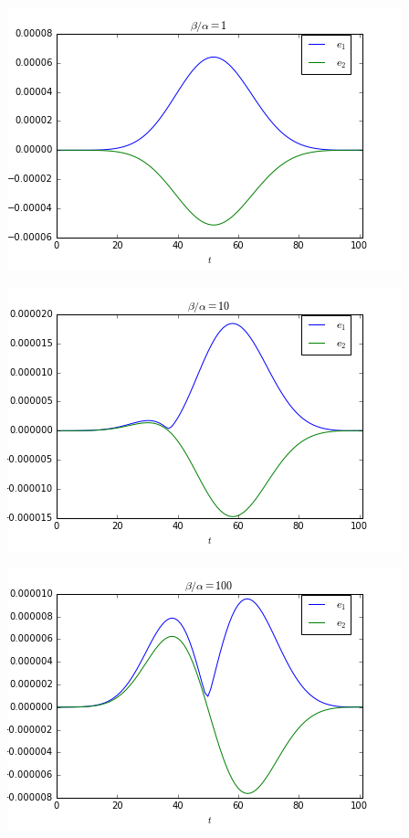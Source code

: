 \noindent\begin{minipage}{\textwidth} 
	\begin{minipage}{.3\textwidth} 
		\includegraphics[scale=.3]{figures/robin1Error.png}	
	\end{minipage}
	\begin{minipage}{.3\textwidth} 
		\includegraphics[scale=.3]{figures/robin10Error.png}	
	\end{minipage}
	\begin{minipage}{.3\textwidth}
		\includegraphics[scale=.3]{figures/robin100Error.png}	
	\end{minipage}
\end{minipage}

